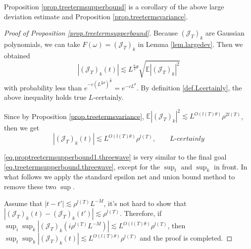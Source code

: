 Proposition \ref{prop.treetermsupperbound} is a corollary of the above large deviation estimate and Proposition \ref{prop.treetermsvariance}.

\begin{proof}[Proof of Proposition \ref{prop.treetermsupperbound}] Because $(\mathcal{J}_{T})_{k}$ are Gaussian polynomials, we can take $F(\omega)=(\mathcal{J}_{T})_{k}$ in Lemma \ref{lem.largedev}. Then we obtained
\begin{equation}
|(\mathcal{J}_{T})_{k}(t)|\lesssim L^{\frac{n}{2}\theta} \sqrt{\mathbb{E}|(\mathcal{J}_T)_k|^2}
\end{equation} 
with probability less than $e^{-c(L^{\frac{n}{2}\theta})^{\frac{2}{n}}}=e^{-cL^{\theta}}$. By definition \ref{def.Lcertainly}, the above inequality holds true $L$-certainly.

Since by Proposition \ref{prop.treetermsvariance}, $\mathbb{E}|(\mathcal{J}_T)_k|^2\lesssim L^{O(l(T)\theta)} \rho^{2l(T)}$, then we get 
\begin{equation}\label{eq.proptreetermsupperbound1.threewave}
|(\mathcal{J}_{T})_{k}(t)|\lesssim L^{O(l(T)\theta)} \rho^{l(T)},\qquad \textit{L-certainly}
\end{equation} 

\eqref{eq.proptreetermsupperbound1.threewave} is very similar to the final goal \eqref{eq.treetermsupperbound.threewave}, except for the $\sup_t$ and $\sup_k$ in front. In what follows we apply the standard epsilon net and union bound method to remove these two $\sup$.

Assume that $|t-t'|\lesssim \rho^{l(T)}L^{-M}$, it's not hard to show that $|(\mathcal{J}_{T})_{k}(t)-(\mathcal{J}_{T})_{k}(t')|\lesssim \rho^{l(T)}$. Therefore, if $\sup_{i} \sup_{k} |(\mathcal{J}_{T})_{k}(i\rho^{l(T)}L^{-M})|\lesssim L^{O(l(T)\theta)} \rho^{l(T)}$, then $\sup_{t} \sup_{k} |(\mathcal{J}_{T})_{k}(t)|\lesssim L^{O(l(T)\theta)} \rho^{l(T)}$ and the proof is completed.


\end{proof}
